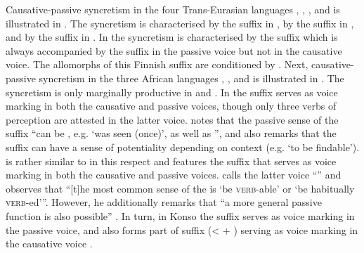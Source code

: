 Causative-passive syncretism in the four Trans-Eurasian languages , , , and  is illustrated in . The syncretism is characterised by the suffix  in , by the suffix  in , and by the suffix  in . In  the syncretism is characterised by the suffix  which is always accompanied by the suffix  in the passive voice but not in the causative voice. The allomorphs of this Finnish suffix are conditioned by . Next, causative-passive syncretism in the three African languages , , and  is illustrated in . The syncretism is only marginally productive in  and . In  the suffix  serves as voice marking in both the causative and passive voices, though only three verbs of perception are attested in the latter voice. \citet[237]{heath:2017b} notes that the passive sense of the suffix “can be , e.g. ‘was seen (once)’, as well as ”, and also remarks that the suffix can have a sense of potentiality depending on context (e.g. ‘to be findable’).  is rather similar to  in this respect and features the suffix  that serves as voice marking in both the causative and passive voices. \citet[382]{heath:2014} calls the latter voice “” and observes that “[t]he most common sense of the  is ‘be \textsc{verb}-able’ or ‘be habitually \textsc{verb}-ed’”. However, he additionally remarks that “a more general passive function is also possible” \citep[382]{heath:2014}. In turn, in Konso the suffix  serves as voice marking in the passive voice, and also forms part of suffix  (<  + ) serving as voice marking in the causative voice \citep[139]{orkaydo:2013}.

